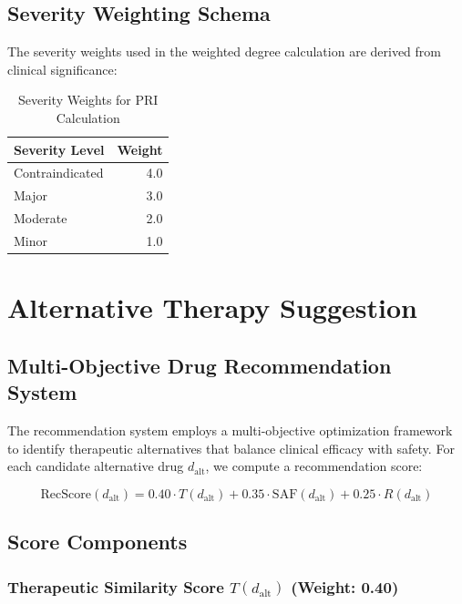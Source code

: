 \documentclass[11pt,a4paper]{article}
\begin{document}
\subsection{Severity Weighting Schema}

The severity weights used in the weighted degree calculation are derived from clinical significance:

\begin{table}[H]
\centering
\caption{Severity Weights for PRI Calculation}
\label{tab:severity_weights}
\begin{tabular}{lr}
\toprule
\textbf{Severity Level} & \textbf{Weight} \\
\midrule
Contraindicated & 4.0 \\
Major & 3.0 \\
Moderate & 2.0 \\
Minor & 1.0 \\
\bottomrule
\end{tabular}
\end{table}

\section{Alternative Therapy Suggestion}

\subsection{Multi-Objective Drug Recommendation System}

The recommendation system employs a multi-objective optimization framework to identify therapeutic alternatives that balance clinical efficacy with safety. For each candidate alternative drug $d_{\text{alt}}$, we compute a recommendation score:

\begin{equation}
\text{RecScore}(d_{\text{alt}}) = 0.40 \cdot T(d_{\text{alt}}) + 0.35 \cdot \text{SAF}(d_{\text{alt}}) + 0.25 \cdot R(d_{\text{alt}})
\label{eq:recscore}
\end{equation}

\subsection{Score Components}

\subsubsection{Therapeutic Similarity Score $T(d_{\text{alt}})$ (Weight: 0.40)}
\end{document}

